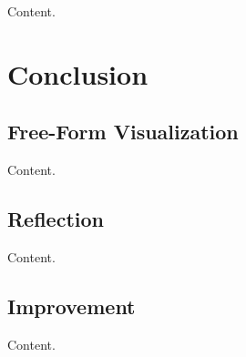 \documentclass{article}
\begin{document}
Content.

\section{Conclusion}

\subsection{Free-Form Visualization}

Content.

\subsection{Reflection}

Content.

\subsection{Improvement}

Content.




\end{document}
